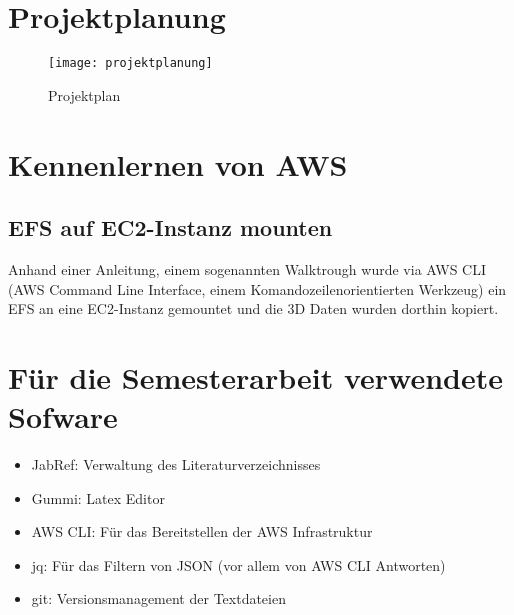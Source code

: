\section{Projektplanung}
\begin{figure}[H]
	\centering
	\texttt{[image: projektplanung]}
	\caption{Projektplan}
	\label{fig:Projektplan}
\end{figure}

\section{Kennenlernen von AWS}

\subsection{EFS auf EC2-Instanz mounten}
Anhand einer Anleitung, einem sogenannten Walktrough wurde via AWS CLI (AWS Command Line Interface, einem Komandozeilenorientierten Werkzeug) ein
EFS an eine EC2-Instanz gemountet und die 3D Daten wurden dorthin kopiert.

\section{Für die Semesterarbeit verwendete Sofware}
\begin{itemize}
\item JabRef: Verwaltung des Literaturverzeichnisses
\item Gummi: Latex Editor
\item AWS CLI: Für das Bereitstellen der AWS Infrastruktur
\item jq: Für das Filtern von JSON (vor allem von AWS CLI Antworten)
\item git: Versionsmanagement der Textdateien
\end{itemize}